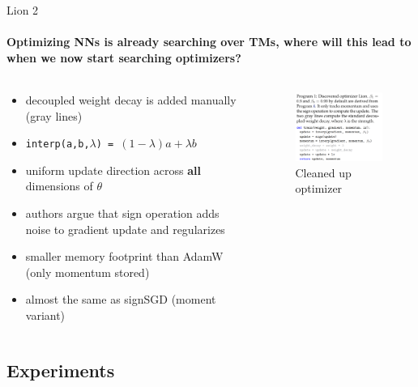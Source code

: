 \documentclass[
	11pt, %
	aspectratio=169, %
]{beamer}
\begin{document}
\begin{frame}{Lion 2}
	\framesubtitle{Optimizing NNs is already searching over TMs, where will this lead to when we now start searching optimizers?}
	 \begin{columns}[c] %
		\begin{column}{0.45\textwidth} %
				\begin{itemize}
					\item decoupled weight decay is added manually (gray lines)
					\item \texttt{interp(a,b,$\lambda$) = $(1-\lambda) a + \lambda b$ } 
					\item uniform update direction across \textbf{all} dimensions of $\theta$
					\item authors argue that sign operation adds noise to gradient update and regularizes
					\item smaller memory footprint than AdamW (only momentum stored)
					\item almost the same as signSGD (moment variant)
				\end{itemize}
		\end{column}
		\begin{column}{0.55\textwidth} %
        	\begin{figure}
        	    \centering
                \includegraphics[width=6.5cm]{figures/signMomentum.png}
        	    \caption*{Cleaned up optimizer }
        	\end{figure}
		\end{column}
	\end{columns}
\end{frame}

\subsection{Experiments}
\end{document}
